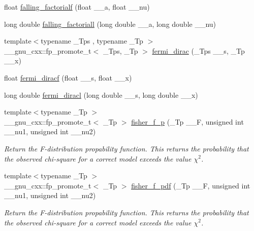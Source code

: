 \begin{DoxyCompactItemize}
float \hyperlink{group__gnu__math__spec__func_gaf32abbc790bfa870725728e5470de532}{falling\+\_\+factorialf} (float \+\_\+\+\_\+a, float \+\_\+\+\_\+nu)
\item 
long double \hyperlink{group__gnu__math__spec__func_gab816c3bcbe00595881799ce969475085}{falling\+\_\+factoriall} (long double \+\_\+\+\_\+a, long double \+\_\+\+\_\+nu)
\item 
{\footnotesize template$<$typename \+\_\+\+Tps , typename \+\_\+\+Tp $>$ }\\\+\_\+\+\_\+gnu\+\_\+cxx\+::fp\+\_\+promote\+\_\+t$<$ \+\_\+\+Tps, \+\_\+\+Tp $>$ \hyperlink{group__gnu__math__spec__func_ga5468fbaed5cb8384cff7cfb9d2188d1a}{fermi\+\_\+dirac} (\+\_\+\+Tps \+\_\+\+\_\+s, \+\_\+\+Tp \+\_\+\+\_\+x)
\item 
float \hyperlink{group__gnu__math__spec__func_gacf7f49b2b7bf50fd37d939236712cbe2}{fermi\+\_\+diracf} (float \+\_\+\+\_\+s, float \+\_\+\+\_\+x)
\item 
long double \hyperlink{group__gnu__math__spec__func_ga3876af54a92853036cc88ec6b8ea5d67}{fermi\+\_\+diracl} (long double \+\_\+\+\_\+s, long double \+\_\+\+\_\+x)
\item 
{\footnotesize template$<$typename \+\_\+\+Tp $>$ }\\\+\_\+\+\_\+gnu\+\_\+cxx\+::fp\+\_\+promote\+\_\+t$<$ \+\_\+\+Tp $>$ \hyperlink{group__gnu__math__spec__func_ga1c769cbf42c1abecc6881cfe67dc6d14}{fisher\+\_\+f\+\_\+p} (\+\_\+\+Tp \+\_\+\+\_\+F, unsigned int \+\_\+\+\_\+nu1, unsigned int \+\_\+\+\_\+nu2)
\begin{DoxyCompactList}\small\item\em Return the F-\/distribution propability function. This returns the probability that the observed chi-\/square for a correct model exceeds the value $ \chi^2 $. \end{DoxyCompactList}\item 
{\footnotesize template$<$typename \+\_\+\+Tp $>$ }\\\+\_\+\+\_\+gnu\+\_\+cxx\+::fp\+\_\+promote\+\_\+t$<$ \+\_\+\+Tp $>$ \hyperlink{group__gnu__math__spec__func_gac4564fd8e265c000675e0f38d656a18a}{fisher\+\_\+f\+\_\+pdf} (\+\_\+\+Tp \+\_\+\+\_\+F, unsigned int \+\_\+\+\_\+nu1, unsigned int \+\_\+\+\_\+nu2)
\begin{DoxyCompactList}\small\item\em Return the F-\/distribution propability function. This returns the probability that the observed chi-\/square for a correct model exceeds the value $ \chi^2 $. \end{DoxyCompactList}\item 

\end{DoxyCompactItemize}

